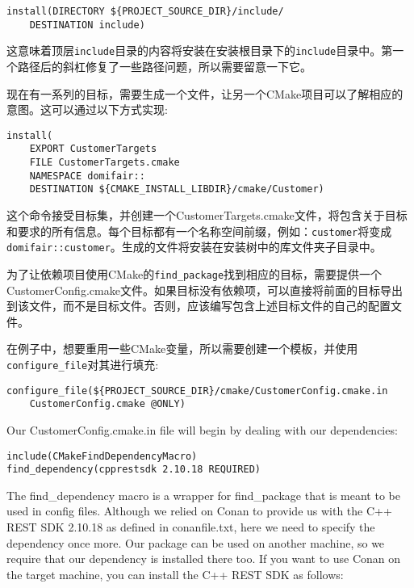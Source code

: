\begin{lstlisting}[style=styleCMake]
install(DIRECTORY ${PROJECT_SOURCE_DIR}/include/
	DESTINATION include)
\end{lstlisting}

这意味着顶层\texttt{include}目录的内容将安装在安装根目录下的\texttt{include}目录中。第一个路径后的斜杠修复了一些路径问题，所以需要留意一下它。

现在有一系列的目标，需要生成一个文件，让另一个CMake项目可以了解相应的意图。这可以通过以下方式实现:

\begin{lstlisting}[style=styleCMake]
install(
	EXPORT CustomerTargets
	FILE CustomerTargets.cmake
	NAMESPACE domifair::
	DESTINATION ${CMAKE_INSTALL_LIBDIR}/cmake/Customer)
\end{lstlisting}

这个命令接受目标集，并创建一个CustomerTargets.cmake文件，将包含关于目标和要求的所有信息。每个目标都有一个名称空间前缀，例如：\texttt{customer}将变成\texttt{domifair::customer}。生成的文件将安装在安装树中的库文件夹子目录中。

为了让依赖项目使用CMake的\texttt{find\_package}找到相应的目标，需要提供一个CustomerConfig.cmake文件。如果目标没有依赖项，可以直接将前面的目标导出到该文件，而不是目标文件。否则，应该编写包含上述目标文件的自己的配置文件。

在例子中，想要重用一些CMake变量，所以需要创建一个模板，并使用\texttt{configure\_file}对其进行填充:

\begin{lstlisting}[style=styleCMake]
configure_file(${PROJECT_SOURCE_DIR}/cmake/CustomerConfig.cmake.in
	CustomerConfig.cmake @ONLY)
\end{lstlisting}

Our CustomerConfig.cmake.in file will begin by dealing with our dependencies:

\begin{lstlisting}[style=styleCMake]
include(CMakeFindDependencyMacro)
find_dependency(cpprestsdk 2.10.18 REQUIRED)
\end{lstlisting}

The find\_dependency macro is a wrapper for find\_package that is meant to be used in config files. Although we relied on Conan to provide us with the C++ REST SDK 2.10.18 as defined in conanfile.txt, here we need to specify the dependency once more. Our package can be used on another machine, so we require that our dependency is installed there too. If you want to use Conan on the target machine, you can install the C++ REST SDK as follows:

